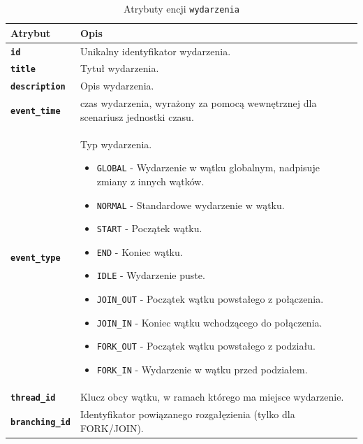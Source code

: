 \begin{table}[H]
    \centering
    \renewcommand{\arraystretch}{1.6}
    \begin{tabular}{|>{\bfseries}l|p{}|}
        \hline
        \rowcolor[HTML]{EFEFEF} \textbf{Atrybut} & \textbf{Opis} \\
        \hline
        \texttt{id} & Unikalny identyfikator wydarzenia. \\
        \hline
        \texttt{title} & Tytuł wydarzenia. \\
        \hline
        \texttt{description} & Opis wydarzenia. \\
        \hline
        \texttt{event\_time} & czas wydarzenia, wyrażony za pomocą wewnętrznej dla scenariusz jednostki czasu. \\
        \hline
        \texttt{event\_type} & Typ wydarzenia.
        \begin{itemize}
            \item \texttt{GLOBAL} - Wydarzenie w wątku globalnym, nadpisuje zmiany z innych wątków.
            \item \texttt{NORMAL} - Standardowe wydarzenie w wątku.
            \item \texttt{START} - Początek wątku.
            \item \texttt{END} - Koniec wątku.
            \item \texttt{IDLE} - Wydarzenie puste.
            \item \texttt{JOIN\_OUT} - Początek wątku powstałego z połączenia.
            \item \texttt{JOIN\_IN} - Koniec wątku wchodzącego do połączenia.
            \item \texttt{FORK\_OUT} - Początek wątku powstałego z podziału.
            \item \texttt{FORK\_IN} - Wydarzenie w wątku przed podziałem.
        \end{itemize} \\
        \hline
        \texttt{thread\_id} & Klucz obcy wątku, w ramach którego ma miejsce wydarzenie. \\
        \hline
        \texttt{branching\_id} & Identyfikator powiązanego rozgałęzienia (tylko dla FORK/JOIN). \\
        \hline
    \end{tabular}
    \caption{Atrybuty encji \texttt{wydarzenia}}
\end{table}


